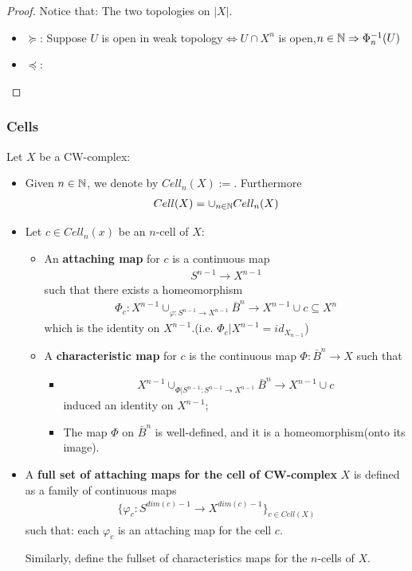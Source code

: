\documentclass[Total.tex]{subfiles}
\begin{document}
	\begin{proof}
		Notice that: The two topologies on $|X|$.
		\begin{itemize}
			\item $\succeq$: Suppose $U$ is open in weak topology$\Leftrightarrow U\cap X^n$ is open,$n\in \mathbb{N}\Rightarrow \Phi_n^{-1}(U)$ 
			\item $\preceq$:
		\end{itemize}
	\end{proof}
		\subsubsection{Cells}
		\begin{Def}
			Let $X$ be a CW-complex:
			\begin{itemize}
				\item Given $n\in \mathbb{N}$, we denote by $Cell_n(X):=$. Furthermore
				\begin{gather*}
					Cell(X)=\cup_{n\in \mathbb{N}} Cell_n(X)
				\end{gather*}
				\item Let $c\in Cell_n(x)$ be an $n$-cell of $X$:
				\begin{itemize}
					\item An \textbf{attaching map} for $c$ is a continuous map
					\begin{gather*}
						S^{n-1}\rightarrow X^{n-1}
					\end{gather*}
					such that there exists a homeomorphism
					\begin{gather*}
						\Phi_c:X^{n-1}\cup_{\varphi:S^{n-1}\rightarrow X^{n-1}} \bar{B}^{n}\rightarrow X^{n-1}\cup c\subseteq X^n
					\end{gather*}
					which is the identity on $X^{n-1}$.(i.e. $\Phi_c|X^{n-1}=id_{X_{n-1}}$)
					\item A \textbf{characteristic map} for $c$ is the continuous map $\Phi:\bar{B}^n\rightarrow X$ such that
					\begin{itemize}
						\item \begin{gather*}
							X^{n-1}\cup_{\Phi|S^{n-1}:S^{n-1}\rightarrow X^{n-1}} \bar{B}^n\rightarrow X^{n-1}\cup c
						\end{gather*}
						induced an identity on $X^{n-1}$;
						\item The map $\Phi$ on $\bar{{B}}^n$ is well-defined, and it is a homeomorphism(onto its image).
					\end{itemize}
				\end{itemize}
				\item A \textbf{full set of attaching maps for the cell of CW-complex} $X$ is defined as a family of continuous maps
				\begin{gather*}
					\{\varphi_c:S^{dim(c)-1}\rightarrow X^{dim(c)-1}\}_{c\in Cell(X)}
				\end{gather*}
				such that: each $\varphi_c$ is an attaching map for the cell $c$. 
				
				Similarly, define the fullset of characteristics maps for the $n$-cells of $X$.
			\end{itemize}
		\end{Def}
\end{document}
